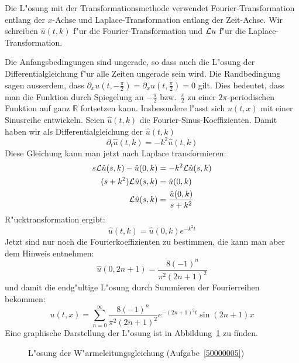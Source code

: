 \begin{loesung}
Die L"osung mit der Transformationsmethode
verwendet Fourier-Transformation
entlang der $x$-Achse und Laplace-Transformation entlang der Zeit-Achse.
Wir schreiben $\hat u(t,k)$ f"ur die Fourier-Transformation und ${\cal L} u$
f"ur die Laplace-Transformation.

Die Anfangsbedingungen sind ungerade, so dass auch die L"osung der
Differentialgleichung f"ur alle Zeiten ungerade sein wird. Die
Randbedingung sagen ausserdem, dass
$\partial_xu(t,-\frac{\pi}2)=\partial_xu(t,\frac{\pi}2)=0$ gilt.
Dies bedeutet, dass man die Funktion durch Spiegelung an
$-\frac{\pi}2$ bzw.~$\frac{\pi}2$ zu einer $2\pi$-periodischen
Funktion auf ganz $\mathbb R$ fortsetzen kann. Insbesondere l"asst
sich $u(t,x)$ mit einer Sinusreihe entwickeln. Seien $\hat u(t,k)$
die Fourier-Sinus-Koeffizienten. Damit haben wir als Differentialgleichung
der $\hat u(t,k)$
\[
\partial_t\hat u(t,k)=-k^2\hat u(t,k)
\]
Diese Gleichung kann man jetzt nach Laplace transformieren:
\begin{align*}
s{\cal L}\hat u(s,k) - \hat u(0,k)&=-k^2 {\cal L}\hat u(s,k)\\
(s+k^2){\cal L}\hat u(s,k)&=\hat u(0,k)\\
{\cal L}\hat u(s,k)&=\frac{\hat u(0,k)}{s+k^2}
\end{align*}
R"ucktransformation ergibt:
\[
\hat u(t,k)=\hat u(0,k) e^{-k^2t}
\]
Jetzt sind nur noch die Fourierkoeffizienten zu bestimmen, die kann
man aber dem Hinweis entnehmen:
\[
\hat u(0,2n+1)=
\frac{8(-1)^n}{\pi^2(2n+1)^2}
\]
und damit die endg"ultige L"osung durch Summieren der Fourierreihen bekommen:
\[
u(t,x)=
\sum_{n=0}^\infty \frac{8(-1)^n}{\pi^2(2n+1)^2}e^{-(2n+1)^2t}\sin(2n+1)x
\]
Eine graphische Darstellung der L"osung ist in Abbildung~\ref{50000005:bild}
zu finden.
\begin{figure}
\begin{center}
\end{center}
\caption{L"osung der W"armeleitungsgleichung (Aufgabe~\ref{50000005})
\label{50000005:bild}}
\end{figure}
\end{loesung}
